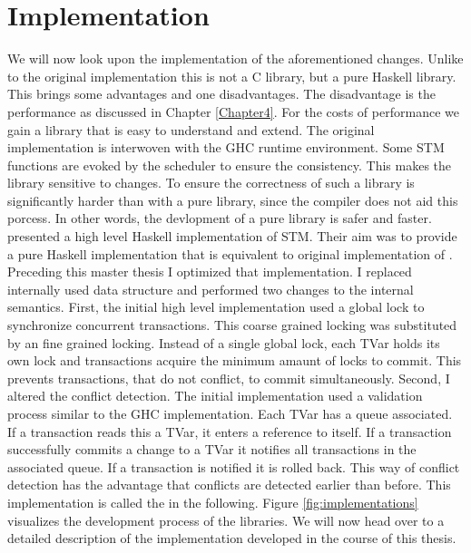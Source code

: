 
\chapter{Implementation} %

\label{Chapter3}

We will now look upon the implementation of the aforementioned changes. Unlike to the original
implementation this is not a C library, but a pure Haskell library. This brings some advantages 
and one disadvantages. The disadvantage is the performance as discussed in Chapter \ref{Chapter4}.
For the costs of performance we gain a library that is easy to understand and extend. The original 
implementation is interwoven with the GHC runtime environment. Some STM functions are evoked by 
the scheduler to ensure the consistency. This makes the library sensitive to changes. 
To ensure the correctness of such a library is significantly harder than with a pure library, since
the compiler does not aid this porcess. In other words, the devlopment of a pure library is safer
and faster. \parencite{STMHigh} presented a high level Haskell implementation of STM. Their aim
was to provide a pure Haskell implementation that is equivalent to original implementation of 
\parencite{STMBase}. Preceding this master thesis I optimized that implementation. I replaced
internally used data structure and performed two changes to the internal semantics. First, 
the initial high level implementation used a global lock to synchronize concurrent transactions.
This coarse grained locking was substituted by an fine grained locking. Instead of a single
global lock, each TVar holds its own lock and transactions acquire the minimum amaunt of 
locks to commit. This prevents transactions, that do not conflict, to commit simultaneously.
Second, I altered the conflict detection. The initial implementation used a validation process
similar to the GHC implementation. Each TVar has a queue associated. If a transaction reads this 
a TVar, it enters a reference to itself. If a transaction successfully commits a change to a TVar it 
notifies all transactions in the associated queue. If a transaction is notified it is rolled back.
This way of conflict detection has the advantage that conflicts are detected earlier than before.
This implementation is called the  in the following. Figure 
\ref{fig:implementations} visualizes the development process of the libraries.
We will now head over to a detailed description of the implementation developed in the course of this 
thesis. 

